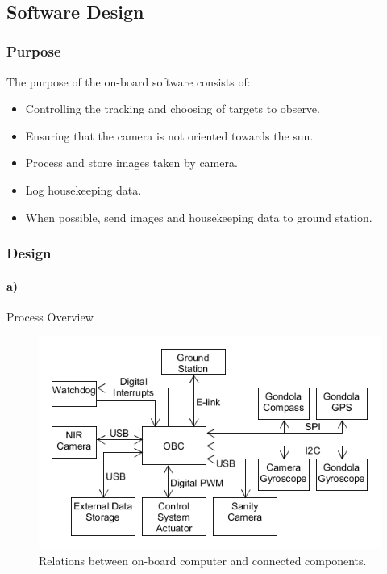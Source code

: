 $  $\pagebreak
\subsection{Software Design}

\subsubsection{Purpose}

The purpose of the on-board software consists of:
\begin{itemize}
	\item Controlling the tracking and choosing of targets to observe.
	\item Ensuring that the camera is not oriented towards the sun.
	\item Process and store images taken by camera.
	\item Log housekeeping data.
	\item When possible, send images and housekeeping data to ground station.
\end{itemize}



\subsubsection{Design}

\paragraph{a)} Process Overview\\

\begin{figure}[H]
	\centering
	\includegraphics[width=\textwidth]{4-experiment-design/img/software/process-overview.png}
	\caption{Relations between on-board computer and connected components.}
	\label{fig:software-process-overview}
\end{figure}

